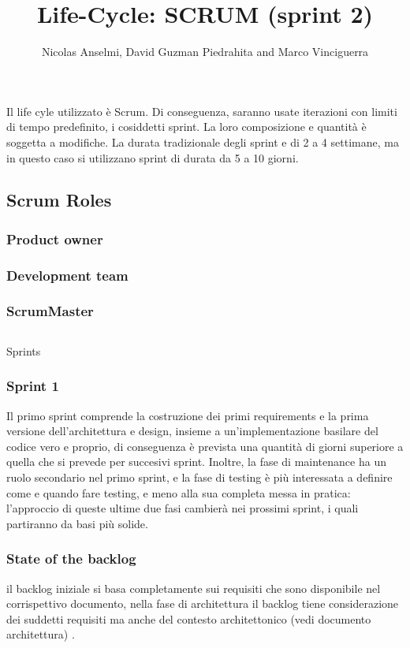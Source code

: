 \documentclass{article}
\title{Life-Cycle: SCRUM  (sprint 2)}
\author{Nicolas Anselmi, David Guzman Piedrahita and Marco Vinciguerra}
\begin{document}
\maketitle

Il life cyle utilizzato è Scrum. Di conseguenza, saranno usate iterazioni con limiti di tempo predefinito, i cosiddetti sprint. La loro composizione e quantità è soggetta a modifiche.
La durata tradizionale degli sprint e di 2 a 4 settimane, ma in questo caso si utilizzano sprint di durata da 5 a 10 giorni.


\subsection{Scrum Roles}
\subsubsection{Product owner}
\subsubsection{Development team}
\subsubsection{ScrumMaster}

\subsection{}{Sprints} 
\subsubsection{Sprint 1}
Il primo sprint comprende la costruzione dei primi requirements e la prima versione dell’architettura e design, insieme a un’implementazione basilare del codice vero e proprio, di conseguenza è prevista una quantità di giorni superiore a quella che si prevede per succesivi sprint. Inoltre, la fase di maintenance ha un ruolo secondario nel primo sprint, e la fase di testing è più interessata a definire come e quando fare testing, e meno alla sua completa messa in pratica: l’approccio di queste ultime due fasi cambierà nei prossimi sprint, i quali partiranno da basi più solide. 
\subsubsection{State of the backlog}
il backlog iniziale si basa completamente sui requisiti che sono disponibile nel corrispettivo documento, nella fase di architettura il backlog tiene considerazione dei suddetti requisiti ma anche del contesto architettonico (vedi documento architettura) . 
\end{document}
